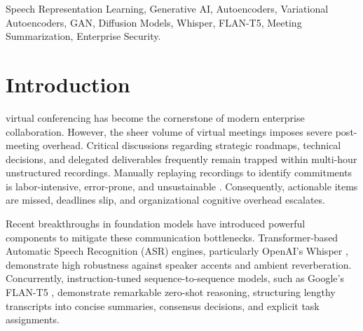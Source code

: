 \documentclass[conference]{IEEEtran}
\begin{document}
\begin{IEEEkeywords}
Speech Representation Learning, Generative AI, Autoencoders, Variational Autoencoders, GAN, Diffusion Models, Whisper, FLAN-T5, Meeting Summarization, Enterprise Security.
\end{IEEEkeywords}

\section{Introduction}
\label{sec:intro}
 virtual conferencing has become the cornerstone of modern enterprise collaboration. However, the sheer volume of virtual meetings imposes severe post-meeting overhead. Critical discussions regarding strategic roadmaps, technical decisions, and delegated deliverables frequently remain trapped within multi-hour unstructured recordings. Manually replaying recordings to identify commitments is labor-intensive, error-prone, and unsustainable \cite{mittalp2024, wang2024}. Consequently, actionable items are missed, deadlines slip, and organizational cognitive overhead escalates.

Recent breakthroughs in foundation models have introduced powerful components to mitigate these communication bottlenecks. Transformer-based Automatic Speech Recognition (ASR) engines, particularly OpenAI's Whisper \cite{radford2023whisper}, demonstrate high robustness against speaker accents and ambient reverberation. Concurrently, instruction-tuned sequence-to-sequence models, such as Google's FLAN-T5 \cite{chung2024flan, raffel2020t5}, demonstrate remarkable zero-shot reasoning, structuring lengthy transcripts into concise summaries, consensus decisions, and explicit task assignments.
\end{document}
